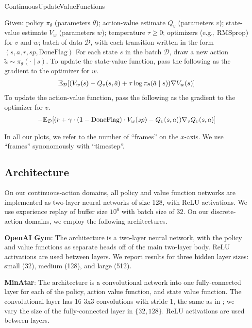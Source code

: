 \documentclass[\main/thesis.tex]{subfiles}
\begin{document}
\begin{algorithm}
\caption{ContinuousUpdateValueFunctions}
\label{alg:continuous-value-update}
\begin{algorithmic}
    \State Given: policy $\pi_\theta$ (parameters $\theta$); action-value estimate $Q_v$ (parameters $v$); state-value estimate $V_w$ (parameters $w$); temperature $\tau \geq 0$; optimizers (e.g., RMSprop) for $v$ and $w$; batch of data $\mathcal{D}$, with each transition written in the form $(s, a, r, sp, \text{DoneFlag})$
    \State For each state $s$ in the batch $\mathcal{D}$, draw a new action $\tilde{a} \sim \pi_\theta(\cdot \mid s)$.
    \State To update the state-value function, pass the following as the gradient to the optimizer for $w$. 
    \begin{align*}
        \mathbb{E}_{\mathcal{D}}[(V_w(s) - Q_v(s, \tilde{a}) + \tau \log \pi_\theta (\tilde{a} \mid s)) \nabla V_w(s)]
    \end{align*}
    \State To update the action-value function, pass the following as the gradient to the optimizer for $v$. 
    \begin{align*}
        -\mathbb{E}_{\mathcal{D}}[(r + \gamma \cdot (1 - \text{DoneFlag})\cdot V_w(sp) - Q_v(s, a)) \nabla_v Q_v(s, a)]
    \end{align*}
\end{algorithmic}
\end{algorithm}

In all our plots, we refer to the number of ``frames'' on the $x$-axis. We use ``frames'' synonomously with ``timestep''. 

\subsection{Architecture}
On our continuous-action domains, all policy and value function networks are implemented as two-layer neural networks of size 128, with ReLU activations. We use experience replay of buffer size $10^6$ with batch size of 32. On our discrete-action domains, we employ the following architectures.

\textbf{OpenAI Gym}: The architecture is a two-layer neural network, with the policy and value functions as separate heads off of the main two-layer body. ReLU activations are used between layers. We report results for three hidden layer sizes: small (32), medium (128), and large (512).

\textbf{MinAtar}: The architecture is a convolutional network into one fully-connected layer for each of the policy, action value function, and state value function. The convolutional layer has 16 3x3 convolutions with stride 1, the same as in \citet{young2019minatar}; we vary the size of the fully-connected layer in $\{32, 128\}$. ReLU activations are used between layers. 
\end{document}

